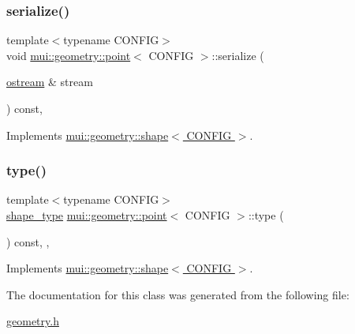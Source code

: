 \subsubsection{\texorpdfstring{serialize()}{serialize()}}
{\footnotesize\ttfamily template$<$typename C\+O\+N\+F\+IG$>$ \\
void \hyperlink{classmui_1_1geometry_1_1point}{mui\+::geometry\+::point}$<$ C\+O\+N\+F\+IG $>$\+::serialize (\begin{DoxyParamCaption}\item[{\hyperlink{classmui_1_1ostream}{ostream} \&}]{stream }\end{DoxyParamCaption}) const\hspace{0.3cm}{\ttfamily [inline]}, {\ttfamily [virtual]}}



Implements \hyperlink{classmui_1_1geometry_1_1shape_ab1b2e763113b96dd0ae3deedfa0e7d22}{mui\+::geometry\+::shape$<$ C\+O\+N\+F\+I\+G $>$}.

\mbox{\label{classmui_1_1geometry_1_1point_ad8984905be09323d1e8d9189fc4a099f}} 
\subsubsection{\texorpdfstring{type()}{type()}}
{\footnotesize\ttfamily template$<$typename C\+O\+N\+F\+IG$>$ \\
\hyperlink{namespacemui_1_1geometry_a5f311a343181e2f20482e5c9afb0f136}{shape\+\_\+type} \hyperlink{classmui_1_1geometry_1_1point}{mui\+::geometry\+::point}$<$ C\+O\+N\+F\+IG $>$\+::type (\begin{DoxyParamCaption}{ }\end{DoxyParamCaption}) const\hspace{0.3cm}{\ttfamily [inline]}, {\ttfamily [virtual]}, {\ttfamily [noexcept]}}



Implements \hyperlink{classmui_1_1geometry_1_1shape_a4a0fe17b8ca5cc29e260cb38c9fcf8fe}{mui\+::geometry\+::shape$<$ C\+O\+N\+F\+I\+G $>$}.



The documentation for this class was generated from the following file\+:\begin{DoxyCompactItemize}
\item 
\hyperlink{geometry_8h}{geometry.\+h}\end{DoxyCompactItemize}
